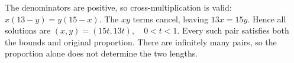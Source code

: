 The denominators are positive, so cross-multiplication is valid: $ x(13-y)=y(15-x)$. The $ xy $ terms cancel, leaving $ 13x=15y $. Hence all solutions are $\boxed{(x,y)=(15t,13t),\quad0<t<1}$. Every such pair satisfies both the bounds and original proportion. There are infinitely many pairs, so the proportion alone does not determine the two lengths.
